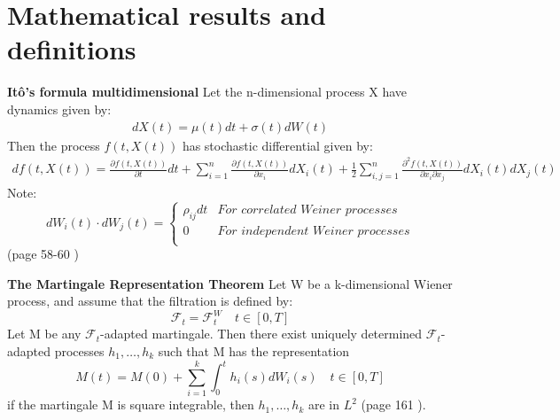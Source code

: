 
\chapter{Mathematical results and definitions} %

\label{AppendixB} %

\begin{theorem}\label{Ito}
\textbf{Itô's formula multidimensional} Let the n-dimensional process X have dynamics given by:
\begin{align}
dX(t)=\mu(t)dt+\sigma(t)dW(t)
\end{align}
Then the process $f(t,X(t))$ has stochastic differential given by:
\begin{equation}
\begin{split}
df(t,X(t))=\frac{\partial f(t,X(t))}{\partial t}  dt + \sum_{i=1}^{n} \frac{\partial f(t,X(t))}{\partial x_i}  dX_i(t) + \frac{1}{2} \sum_{i,j=1}^{n} \frac{\partial^2 f(t,X(t))}{\partial x_i \partial x_j}  dX_i(t)dX_j(t)  
\end{split}
\end{equation}
Note: \[ dW_i(t) \cdot dW_j(t)= \begin{cases} 
      \rho_{ij}dt & \textit{For correlated Weiner processes} \\
      0 & \textit{For independent Weiner processes} \\
   \end{cases}
\]
(page 58-60 \parencite{finKont})
\end{theorem}

\begin{theorem}\label{MRT}
\textbf{The Martingale Representation Theorem} 
Let W be a k-dimensional Wiener process, and assume that the filtration is defined by:
$$\mathcal{F}_t=\mathcal{F}_t^W \quad t\in [0,T]$$
Let M be any $\mathcal{F}_t$-adapted martingale. Then there exist uniquely determined $\mathcal{F}_t$-adapted processes $h_1, \ldots, h_k$ such that M has the representation
$$M(t)=M(0) + \sum_{i=1}^{k} \int_{0}^{t} h_i(s)dW_i(s) \quad t \in [0,T]$$
if the martingale M is square integrable, then $h_1, \ldots, h_k$ are in $L^2$ (page 161 \parencite{finKont}).
\end{theorem}

